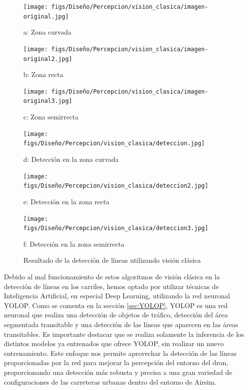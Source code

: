 \begin{figure}[H]
  \centering
  \begin{minipage}[t]{0.3\textwidth}
      \centering
      \texttt{[image: figs/Diseño/Percepcion/vision\_clasica/imagen-original.jpg]}
      \caption*{a: Zona curvada}
  \end{minipage}
  \hfill
  \begin{minipage}[t]{0.3\textwidth}
      \centering
      \texttt{[image: figs/Diseño/Percepcion/vision\_clasica/imagen-original2.jpg]}
      \caption*{b: Zona recta}
  \end{minipage}
  \hfill
  \begin{minipage}[t]{0.3\textwidth}
      \centering
      \texttt{[image: figs/Diseño/Percepcion/vision\_clasica/imagen-original3.jpg]}
      \caption*{c: Zona semirrecta}
  \end{minipage}
  
  \vspace{1cm}
  
  \begin{minipage}[t]{0.3\textwidth}
      \centering
      \texttt{[image: figs/Diseño/Percepcion/vision\_clasica/deteccion.jpg]}
      \caption*{d: Detección en la zona curvada}
  \end{minipage}
  \hfill
  \begin{minipage}[t]{0.3\textwidth}
      \centering
      \texttt{[image: figs/Diseño/Percepcion/vision\_clasica/deteccion2.jpg]}
      \caption*{e: Detección en la zona recta}
  \end{minipage}
  \hfill
  \begin{minipage}[t]{0.3\textwidth}
      \centering
      \texttt{[image: figs/Diseño/Percepcion/vision\_clasica/deteccion3.jpg]}
      \caption*{f: Detección en la zona semirrecta}
  \end{minipage}
  \caption{Resultado de la detección de líneas utilizando visión clásica}
  \label{Vision_clasica}
\end{figure}

Debido al mal funcionamiento de estos algoritmos de visión clásica en la detección de líneas en los carriles, 
hemos optado por utilizar técnicas de Inteligencia Artificial, en especial Deep Learning, utilizando la red neuronal YOLOP. Como se comenta en la sección \ref{sec:YOLOP}, 
YOLOP es una red neuronal que realiza una detección de objetos de tráfico, detección del área segmentada transitable y una detección de las líneas que aparecen en las áreas transitables. Es importante 
destacar que se realiza solamente la inferencia de los distintos modelos ya entrenados que ofrece YOLOP, sin realizar un nuevo entrenamiento. Este enfoque nos permite aprovechar 
la detección de las líneas proporcionadas por la red para mejorar la percepción del entorno del dron, proporcionando una detección más robusta y precisa a una gran variedad de configuraciones
de las carreteras urbanas dentro del entorno de Airsim. 

